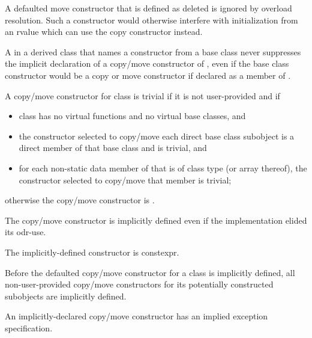 \begin{note}
A defaulted move constructor that is defined as deleted is ignored by overload
resolution.
Such a constructor would otherwise interfere with initialization from
an rvalue which can use the copy constructor instead.
\end{note}

\pnum
\begin{note}
A  in a derived class  that
names a constructor from a base class
never suppresses the implicit declaration of
a copy/move constructor of ,
even if the base class constructor would be
a copy or move constructor
if declared as a member of .
\end{note}

\pnum
{}%
%
A copy/move constructor for class
is
trivial
if it is not user-provided and if
\begin{itemize}
\item
class
has no virtual functions
and no virtual base classes, and

\item
the constructor selected to copy/move each direct base class subobject
is a direct member of that base class and is trivial, and

\item
for each non-static data member of
that is of class type (or array thereof),
the constructor selected to copy/move that member is trivial;
\end{itemize}

%
otherwise the copy/move constructor is
.

\pnum
\begin{note}
The copy/move constructor is implicitly defined even if the implementation elided
its odr-use.
\end{note}
The implicitly-defined constructor is constexpr.

\pnum
Before the defaulted copy/move constructor for a class is
implicitly defined,
all non-user-provided copy/move constructors for its
potentially constructed subobjects
are implicitly defined.
\begin{note}
An implicitly-declared copy/move constructor has an
implied exception specification.
\end{note}

